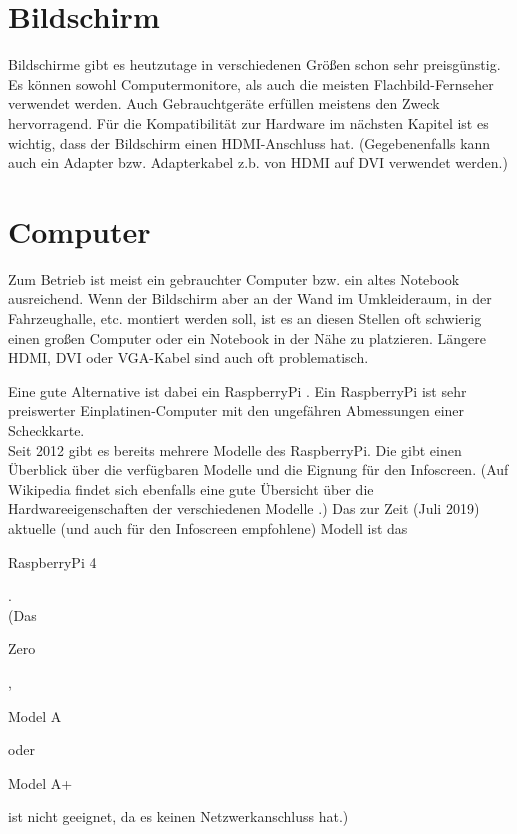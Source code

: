 \section{Bildschirm}
\label{sec:bildschirm}
Bildschirme gibt es heutzutage in verschiedenen Größen schon sehr preisgünstig.
Es können sowohl Computermonitore, als auch die meisten Flachbild-Fernseher verwendet werden.
Auch Gebrauchtgeräte erfüllen meistens den Zweck hervorragend.
Für die Kompatibilität zur Hardware im nächsten Kapitel ist es wichtig, dass der Bildschirm einen HDMI-Anschluss \cite{hdmi} hat.
(Gegebenenfalls kann auch ein Adapter bzw. Adapterkabel z.b. von HDMI auf DVI verwendet werden.)

\section{Computer}
\label{sec:rpi}
Zum Betrieb ist meist ein gebrauchter Computer bzw. ein altes Notebook ausreichend.
Wenn der Bildschirm aber an der Wand im Umkleideraum, in der Fahrzeughalle, etc. montiert werden soll,
ist es an diesen Stellen oft schwierig einen großen Computer oder ein Notebook in der Nähe zu platzieren.
Längere HDMI, DVI oder VGA-Kabel sind auch oft problematisch.

Eine gute Alternative ist dabei ein RaspberryPi \cite{rpi}. Ein RaspberryPi ist sehr preiswerter Einplatinen-Computer mit den ungefähren Abmessungen einer Scheckkarte.\\
Seit 2012 gibt es bereits mehrere Modelle des RaspberryPi. Die  gibt einen Überblick über die verfügbaren Modelle und die Eignung für den Infoscreen. 
(Auf Wikipedia findet sich ebenfalls eine gute Übersicht über die Hardwareeigenschaften der verschiedenen Modelle \cite{wikirpi}.)
Das zur Zeit (Juli 2019) aktuelle (und auch für den Infoscreen empfohlene) Modell ist das \begin{em}RaspberryPi 4\end{em}.\\
(Das \begin{em}Zero\end{em}, \begin{em}Model A\end{em} oder \begin{em}Model A+\end{em} ist nicht geeignet, da es keinen Netzwerkanschluss hat.)

